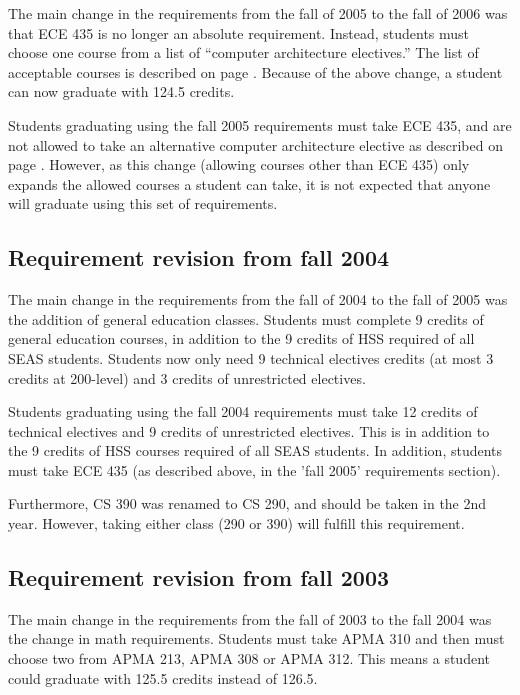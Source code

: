 \documentclass[12pt,twoside]{article}
\begin{document}
The main change in the requirements from the fall of 2005 to the fall
of 2006 was that ECE 435 is no longer an absolute requirement.
Instead, students must choose one course from a list of ``computer
architecture electives.''  The list of acceptable courses is described
on page \pageref{comparchelective}.  Because of the above change, a
student can now graduate with 124.5 credits.

Students graduating using the fall 2005 requirements must take ECE 435,
and are not allowed to take an alternative computer architecture
elective as described on page \pageref{comparchelective}.  However, as
this change (allowing courses other than ECE 435) only expands the
allowed courses a student can take, it is not expected that anyone
will graduate using this set of requirements.

       
\subsection{Requirement revision from fall 2004}

The main change in the requirements from the fall of 2004 to the fall
of 2005 was the addition of general education classes.  Students must
complete 9 credits of general education courses, in addition to the 9
credits of HSS required of all SEAS students. Students now only need
9 technical electives credits (at most 3 credits at 200-level) and 3
credits of unrestricted electives.

Students graduating using the fall 2004 requirements must take 12
credits of technical electives and 9 credits of unrestricted
electives.  This is in addition to the 9 credits of HSS courses
required of all SEAS students.  In addition, students must take ECE
435 (as described above, in the 'fall 2005' requirements section).

Furthermore, CS 390 was renamed to CS 290, and should be taken in the
2nd year.  However, taking either class (290 or 390) will fulfill this
requirement.


\subsection{Requirement revision from fall 2003}

The main change in the requirements from the fall of 2003 to the fall
2004 was the change in math requirements.  Students must take APMA 310 and
then must choose two from APMA 213, APMA 308 or APMA 312.   This means
a student could graduate with 125.5 credits instead of 126.5.
\end{document}
